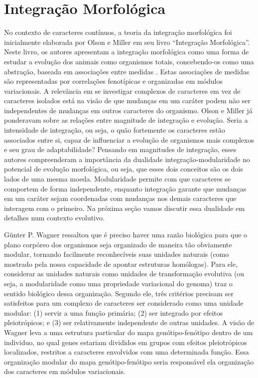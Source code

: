 \documentclass[portuges,]{tufte-handout}
\begin{document}
\section{Integração Morfológica}\label{integrauxe7uxe3o-morfoluxf3gica}

No contexto de caracteres contínuos, a teoria da integração morfológica
foi inicialmente elaborada por Olson e Miller em seu livro ``Integração
Morfológica''. Neste livro, os autores apresentam a integração
morfológica como uma forma de estudar a evolução dos animais como
organismos totais, concebendo-os como uma abstração, baseada em
associações entre medidas \cite{Olson1958}. Estas associações de
medidas são representadas por correlações fenotípicas e organizadas em
módulos variacionais. A relevância em se investigar complexos de
caracteres em vez de caracteres isolados está na visão de que mudanças
em um caráter podem não ser independentes de mudanças em outros
caracteres do organismo. Olson e Miller já ponderavam sobre as relações
entre magnitude de integração e evolução. Seria a intensidade de
integração, ou seja, o quão fortemente os caracteres estão associados
entre si, capaz de influenciar a evolução de organismos mais complexos e
seu grau de adaptabilidade? Pensando em magnitudes de integração, esses
autores compreenderam a importância da dualidade integração-modularidade
no potencial de evolução morfológica, ou seja, que esses dois conceitos
são os dois lados de uma mesma moeda. Modularidade permite com que
caracteres se comportem de forma independente, enquanto integração
garante que mudanças em um caráter sejam coordenadas com mudanças nos
demais caracteres que interagem com o primeiro. Na próxima seção vamos
discutir essa dualidade em detalhes num contexto evolutivo.

Günter P. Wagner \cite{Wagner1996} ressaltou que é preciso haver uma
razão biológica para que o plano corpóreo dos organismos seja organizado
de maneira tão obviamente modular, tornando facilmente reconhecíveis
suas unidades naturais (como mostrado pela nossa capacidade de apontar
estruturas homólogas). Para ele, considerar as unidades naturais como
unidades de transformação evolutiva (ou seja, a modularidade como uma
propriedade variacional do genoma) traz o sentido biológico dessa
organização. Segundo ele, três critérios precisam ser satisfeitos para
um complexo de caracteres ser considerado como uma unidade modular: (1)
servir a uma função primária; (2) ser integrado por efeitos
pleiotrópicos; e (3) ser relativamente independente de outras unidades.
A visão de Wagner leva a uma estrutura particular do mapa
genótipo-fenótipo dentro de um individuo, no qual genes estariam
divididos em grupos com efeitos pleiotrópicos localizados, restritos a
caracteres envolvidos com uma determinada função. Essa organização
modular do mapa genótipo-fenótipo seria responsável ela organização dos
caracteres em módulos variacionais.
\end{document}
